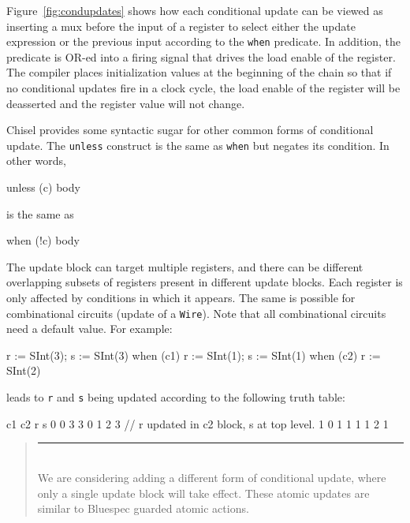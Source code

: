 \documentclass[twocolumn,10pt]{article}
\newenvironment{commentary}
{ \vspace{-0.1in}
  \begin{quotation}
  \noindent
  \small \em
  \rule{\linewidth}{1pt}\\
}
{
  \end{quotation}
}
\def\code#1{{\tt #1}}
\begin{document}
Figure~\ref{fig:condupdates} shows how each conditional update can be
viewed as inserting a mux before the input of a register to select
either the update expression or the previous input according to the
\code{when} predicate.  In addition, the predicate is OR-ed into a
firing signal that drives the load enable of the register.  The
compiler places initialization values at the beginning of the chain so
that if no conditional updates fire in a clock cycle, the load enable
of the register will be deasserted and the register value will not
change.
 
Chisel provides some syntactic sugar for other common forms of
conditional update.  The \verb+unless+ construct is the same as
\verb+when+ but negates its condition.  In other words,
\begin{scala}
unless (c) { body }
\end{scala}
is the same as
\begin{scala}
when (!c) { body }
\end{scala}

% 

The update block can target multiple registers, and there can be
different overlapping subsets of registers present in different update
blocks.  Each register is only affected by conditions in which it
appears.  The same is possible for combinational circuits (update
of a \code{Wire}). Note that all combinational
circuits need a default value. For example:
\begin{scala}
r := SInt(3); s := SInt(3)
when (c1)   { r := SInt(1); s := SInt(1) }
when (c2)   { r := SInt(2) }
\end{scala}

\noindent
leads to \code{r} and \code{s} being updated according to the
following truth table:
\begin{scala}
c1 c2  r  s
0   0  3  3
0   1  2  3 // r updated in c2 block, s at top level.
1   0  1  1
1   1  2  1
\end{scala}

\begin{commentary}
We are considering adding a different form of conditional update,
where only a single update block will take effect.  These atomic
updates are similar to Bluespec guarded atomic actions.
\end{commentary}
\end{document}

